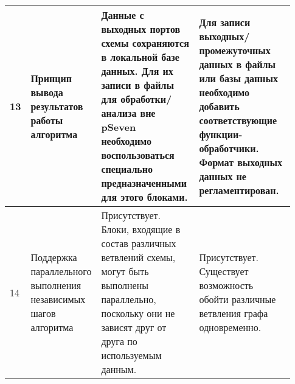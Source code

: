 \begin{landscape}
\begin{longtable}{|p{0.03\linewidth}|p{0.2\linewidth}|p{0.35\linewidth}|p{0.35\linewidth}|}
        13         & Принцип вывода результатов работы алгоритма                                                & Данные с выходных портов схемы сохраняются в локальной базе данных. Для их записи в файлы для обработки/анализа вне pSeven необходимо воспользоваться специально предназначенными для этого блоками.                                                                                                                                                                                                                                                                                                                                                                                                                                                               & Для записи выходных/промежуточных данных в файлы или базы данных необходимо добавить соответствующие функции-обработчики. Формат выходных данных не регламентирован.                                                                                                                             \\
        \hline
        14         & Поддержка параллельного выполнения независимых шагов алгоритма                             & Присутствует. Блоки, входящие в состав различных ветвлений схемы, могут быть выполнены параллельно, поскольку они не зависят друг от друга по используемым данным.                                                                                                                                                                                                                                                                                                                                                                                                                                                                                                 & Присутствует. Существует возможность обойти различные ветвления графа одновременно.                                                                                                                                                                                                              \\
        \hline

\end{longtable}
\end{landscape}
